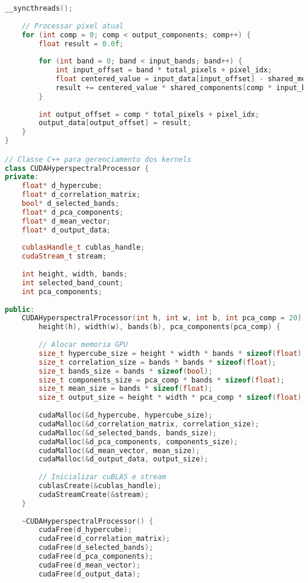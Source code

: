 \begin{lstlisting}[language=C++]
    __syncthreads();
    
    // Processar pixel atual
    for (int comp = 0; comp < output_components; comp++) {
        float result = 0.0f;
        
        for (int band = 0; band < input_bands; band++) {
            int input_offset = band * total_pixels + pixel_idx;
            float centered_value = input_data[input_offset] - shared_mean[band];
            result += centered_value * shared_components[comp * input_bands + band];
        }
        
        int output_offset = comp * total_pixels + pixel_idx;
        output_data[output_offset] = result;
    }
}

// Classe C++ para gerenciamento dos kernels
class CUDAHyperspectralProcessor {
private:
    float* d_hypercube;
    float* d_correlation_matrix;
    bool* d_selected_bands;
    float* d_pca_components;
    float* d_mean_vector;
    float* d_output_data;
    
    cublasHandle_t cublas_handle;
    cudaStream_t stream;
    
    int height, width, bands;
    int selected_band_count;
    int pca_components;
    
public:
    CUDAHyperspectralProcessor(int h, int w, int b, int pca_comp = 20) :
        height(h), width(w), bands(b), pca_components(pca_comp) {
        
        // Alocar memoria GPU
        size_t hypercube_size = height * width * bands * sizeof(float);
        size_t correlation_size = bands * bands * sizeof(float);
        size_t bands_size = bands * sizeof(bool);
        size_t components_size = pca_comp * bands * sizeof(float);
        size_t mean_size = bands * sizeof(float);
        size_t output_size = height * width * pca_comp * sizeof(float);
        
        cudaMalloc(&d_hypercube, hypercube_size);
        cudaMalloc(&d_correlation_matrix, correlation_size);
        cudaMalloc(&d_selected_bands, bands_size);
        cudaMalloc(&d_pca_components, components_size);
        cudaMalloc(&d_mean_vector, mean_size);
        cudaMalloc(&d_output_data, output_size);
        
        // Inicializar cuBLAS e stream
        cublasCreate(&cublas_handle);
        cudaStreamCreate(&stream);
    }
    
    ~CUDAHyperspectralProcessor() {
        cudaFree(d_hypercube);
        cudaFree(d_correlation_matrix);
        cudaFree(d_selected_bands);
        cudaFree(d_pca_components);
        cudaFree(d_mean_vector);
        cudaFree(d_output_data);
        

\end{lstlisting}
